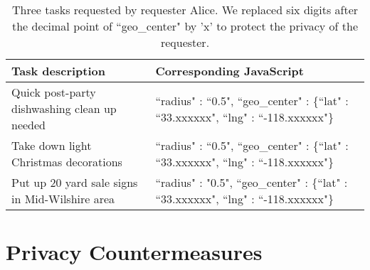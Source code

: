 \documentclass{USC-Thesis}
\numberwithin{equation}{chapter}
\begin{document}
\begin{table}
\begin{center}
    \begin{tabular}{ p{5cm}  |   p{6cm}}
    \hline
	Task description & Corresponding JavaScript \\ \hline
    Quick post-party dishwashing clean up needed & \small{``radius" : ``0.5", ``geo\_center" : \{``lat" : ``33.xxxxxx", ``lng" : ``-118.xxxxxx"\}} \\ \hline
    Take down light Christmas decorations & \small{``radius" : ``0.5", ``geo\_center" : \{``lat" : ``33.xxxxxx", ``lng" : ``-118.xxxxxx"\}} \\ \hline
    Put up 20 yard sale signs in Mid-Wilshire area & \small{``radius" : "0.5", ``geo\_center" : \{``lat" : ``33.xxxxxx", ``lng" : ``-118.xxxxxx"\}} \\ \hline
    \end{tabular}
	\caption{Three tasks requested by requester Alice. We replaced six digits after the decimal point of ``geo\_center" by 'x' to protect the privacy of the requester.}
    \label{tab:requested_tasks}
    \end{center}
\end{table}

\section{Privacy Countermeasures}
\end{document}
